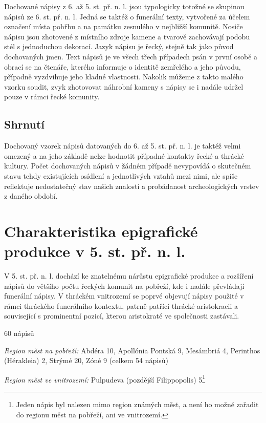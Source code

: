 Dochované nápisy z 6. až 5. st. př. n. l. jsou typologicky totožné se skupinou nápisů ze 6. st. př. n. l. Jedná se taktéž o funerální texty, vytvořené za účelem označení místa pohřbu a na památku zesnulého v nejbližší komunitě. Nosiče nápisu jsou zhotovené z místního zdroje kamene a tvarově zachovávají podobu stél s jednoduchou dekorací. Jazyk nápisu je řecký, stejně tak jako původ dochovaných jmen. Text nápisů je ve všech třech případech psán v první osobě a obrací se na čtenáře, kterého informuje o identitě zemřelého a jeho původu, případně vyzdvihuje jeho kladné vlastnosti. Nakolik můžeme z takto malého vzorku soudit, zvyk zhotovovat náhrobní kameny s nápisy se i nadále udržel pouze v rámci řecké komunity.

\subsection[shrnutí-4]{Shrnutí}

Dochovaný vzorek nápisů datovaných do 6. až 5. st. př. n. l. je taktéž velmi omezený a na jeho základě nelze hodnotit případné kontakty řecké a thrácké kultury. Počet dochovaných nápisů v žádném případě nevypovídá o skutečném stavu tehdy existujících osídlení a jednotlivých vztahů mezi nimi, ale spíše reflektuje nedostatečný stav našich znalostí a probádanost archeologických vrstev z daného období.

\section[charakteristika-epigrafické-produkce-v-5.-st.-př.-n.-l.]{Charakteristika epigrafické produkce v 5. st. př. n. l.}

V 5. st. př. n. l. dochází ke znatelnému nárůstu epigrafické produkce a rozšíření nápisů do většího počtu řeckých komunit na pobřeží, kde i nadále převládají funerální nápisy. V thráckém vnitrozemí se poprvé objevují nápisy použité v rámci thráckého funerálního kontextu, patrně patřící thrácké aristokracii a související s prominentní pozicí, kterou aristokraté ve společnosti zastávali.

\placetable[none]{}
\starttable[|l|]
\HL
{} 60 nápisů

{\em Region měst na pobřeží:} Abdéra 10, Apollónia Pontská 9, Mesámbriá 4, Perinthos (Hérakleia) 2, Strýmé 20, Zóné 9 (celkem 54 nápisů)

{\em Region měst ve vnitrozemí:} Pulpudeva (pozdější Filippopolis) 5\footnote{Jeden nápis byl nalezen mimo region známých měst, a není ho možné zařadit do regionu měst na pobřeží, ani ve vnitrozemí.}

